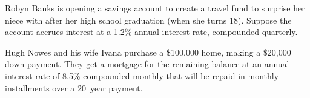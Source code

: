 \documentclass[12pt,letterpaper]{exam}
\begin{document}
\begin{questions}





\newpage
\question[10] Robyn Banks is opening a savings account to create a travel fund to surprise her niece with after her high school graduation (when she turns 18). Suppose the account accrues interest at a 1.2\% annual interest rate, compounded quarterly. \pspace





\newpage
\question[10] Hugh Nowes and his wife Ivana purchase a \$100,000 home, making a \$20,000 down payment. They get a mortgage for the remaining balance at an annual interest rate of 8.5\% compounded monthly that will be repaid in monthly installments over a 20~year payment. \pspace






\end{questions}
\end{document}

